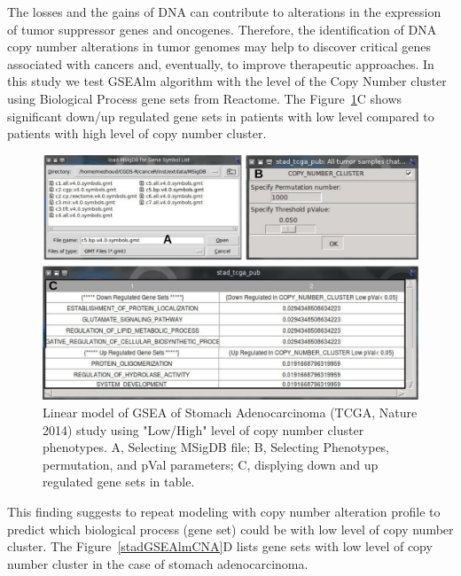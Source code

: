 \documentclass[a4paper]{article}
\begin{document}
 The losses and the gains of DNA can contribute to alterations in the expression of tumor suppressor genes and oncogenes. Therefore, the identification of DNA copy number alterations in tumor genomes may help to discover critical genes associated with cancers and, eventually, to improve therapeutic approaches. In this study we test GSEAlm algorithm with the level of the Copy Number cluster using Biological Process gene sets from Reactome. The Figure~\ref{stadGSEAlm}C shows significant down/up regulated gene sets in patients with low level compared to patients with high level of copy number cluster.
 
 
 \begin{figure}[!ht]
  \centering
 \includegraphics[scale=2]{image/stadGSEAlm.png}
 \caption{Linear model of GSEA of Stomach Adenocarcinoma (TCGA, Nature 2014) study using "Low/High" level of copy number cluster phenotypes. A, Selecting MSigDB file; B, Selecting Phenotypes, permutation, and pVal parameters; C, displying down and up regulated gene sets in table.}
 \label{stadGSEAlm}
 \end{figure}
 
This finding suggests to repeat modeling with copy number alteration profile to predict which biological process (gene set) could be with low level of copy number cluster. The Figure~\ref{stadGSEAlmCNA}D lists gene sets with low level of copy number cluster in the case of stomach adenocarcinoma.
 
\end{document}
